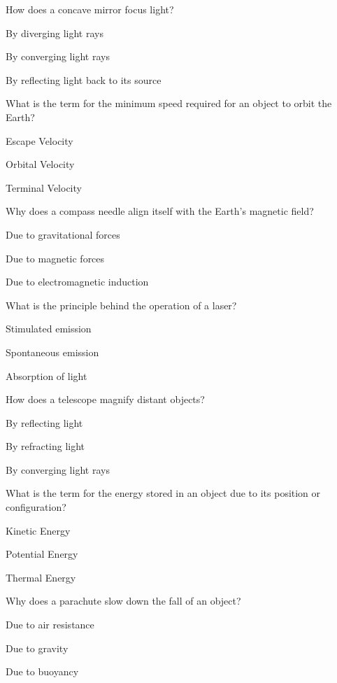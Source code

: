 \begin{enhancedmcq}{How does a concave mirror focus light?}
\item By diverging light rays
\item By converging light rays
\item By reflecting light back to its source

\end{enhancedmcq}
\begin{enhancedmcq}{What is the term for the minimum speed required for an object to orbit the Earth?}
\item Escape Velocity
\item Orbital Velocity
\item Terminal Velocity

\end{enhancedmcq}
\begin{enhancedmcq}{Why does a compass needle align itself with the Earth's magnetic field?}
\item Due to gravitational forces
\item Due to magnetic forces
\item Due to electromagnetic induction

\end{enhancedmcq}
\begin{enhancedmcq}{What is the principle behind the operation of a laser?}
\item Stimulated emission
\item Spontaneous emission
\item Absorption of light

\end{enhancedmcq}
\begin{enhancedmcq}{How does a telescope magnify distant objects?}
\item By reflecting light
\item By refracting light
\item By converging light rays

\end{enhancedmcq}
\begin{enhancedmcq}{What is the term for the energy stored in an object due to its position or configuration?}
\item Kinetic Energy
\item Potential Energy
\item Thermal Energy

\end{enhancedmcq}
\begin{enhancedmcq}{Why does a parachute slow down the fall of an object?}
\item Due to air resistance
\item Due to gravity
\item Due to buoyancy

\end{enhancedmcq}

